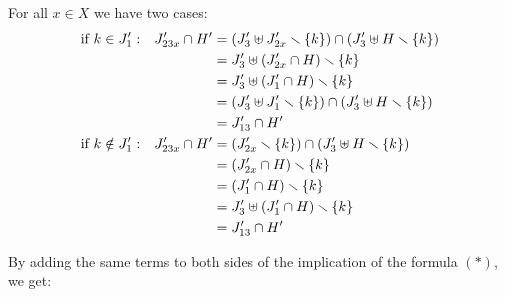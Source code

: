 \documentclass[runningheads]{llncs}
\begin{document}
\begin{enumerate}
For all $x \in X$ we have two cases:
\begin{align*}
		\text{if } k \in J'_1: && J'_{23x} \cap H' & = {\left(J'_{3} \uplus J'_{2x} \smallsetminus {\left\{k\right\}}\right)} \cap  {\left(J'_{3} \uplus H \smallsetminus{\left\{k\right\}}\right)}\\
		&&& = J'_{3}  \uplus {\left(J'_{2x} \cap H\right)} \smallsetminus {\left\{k\right\}} \\
		&&& = J'_{3} \uplus {\left(J'_1 \cap H\right)} \smallsetminus {\left\{k\right\}} \\
		&&& = {\left( J'_{3} \uplus J'_1 \smallsetminus {\left\{k\right\}}\right)} \cap {\left(J'_{3} \uplus H \smallsetminus{\left\{k\right\}}\right)}\\
		&&& = J'_{13} \cap H'\\
\text{if } k \notin J'_1: && J'_{23x} \cap H' & = {\left(J'_{2x} \smallsetminus {\left\{k\right\}}\right)} \cap {\left(J'_3 \uplus H \smallsetminus{\left\{k\right\}}\right)} \\
		&&& = {\left(J'_{2x} \cap H\right)} \smallsetminus {\left\{k\right\}} \\
		&&& = {\left(J'_1 \cap H\right)} \smallsetminus {\left\{k\right\}}  \\
		&&& = J'_3 \uplus {\left(J'_1 \cap H\right)} \smallsetminus {\left\{k\right\}}  \\
		&&& = J'_{13} \cap H'
		\end{align*}
	

\smallskip

By adding the same terms to both sides of the implication of the  formula $(*)$, we get:


\end{enumerate}
\end{document}
